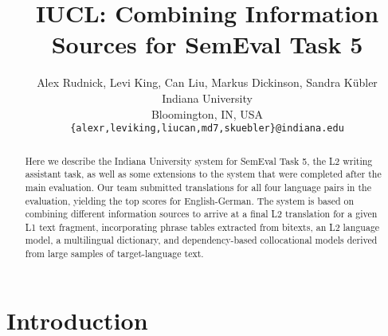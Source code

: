 \documentclass[11pt]{article}
\title{IUCL: Combining Information Sources for SemEval Task 5}
\author{Alex Rudnick, Levi King, Can Liu, Markus Dickinson, Sandra K\"ubler  \\
  Indiana University \\
  Bloomington, IN, USA \\
  {\tt \{alexr,leviking,liucan,md7,skuebler\}@indiana.edu} }
\date{}
\begin{document}
\maketitle
\begin{abstract}
Here we describe the Indiana University system for SemEval Task 5, the L2
writing assistant task, as well as some extensions to the system that were
completed after the main evaluation. Our team submitted translations for all
four language pairs in the evaluation, yielding the top scores for
English-German.  The system is based on combining different information sources
to arrive at a final L2 translation for a given L1 text fragment, incorporating
phrase tables extracted from bitexts, an L2 language model, a multilingual
dictionary, and dependency-based collocational models derived from large
samples of target-language text.
\end{abstract}


\section{Introduction}

\end{document}
